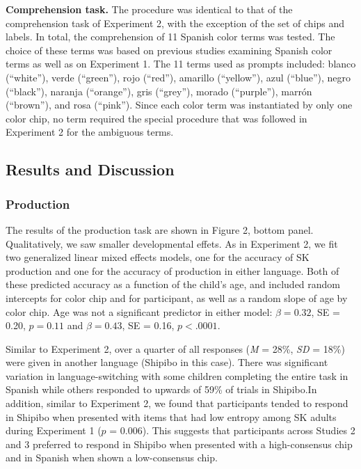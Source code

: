 \documentclass[,man,floatsintext]{apa6}
\theoremstyle{definition}
\theoremstyle{definition}
\theoremstyle{definition}
\theoremstyle{remark}
\begin{document}
\textbf{Comprehension task.} The procedure was identical to that of the
comprehension task of Experiment 2, with the exception of the set of
chips and labels. In total, the comprehension of 11 Spanish color terms
was tested. The choice of these terms was based on previous studies
examining Spanish color terms as well as on Experiment 1. The 11 terms
used as prompts included: blanco (\enquote{white}), verde
(\enquote{green}), rojo (\enquote{red}), amarillo (\enquote{yellow}),
azul (\enquote{blue}), negro (\enquote{black}), naranja
(\enquote{orange}), gris (\enquote{grey}), morado (\enquote{purple}),
marrón (\enquote{brown}), and rosa (\enquote{pink}). Since each color
term was instantiated by only one color chip, no term required the
special procedure that was followed in Experiment 2 for the ambiguous
terms.

\subsection{Results and Discussion}\label{results-and-discussion-2}

\subsubsection{Production}\label{production-1}

The results of the production task are shown in Figure 2, bottom panel.
Qualitatively, we saw smaller developmental effets. As in Experiment 2,
we fit two generalized linear mixed effects models, one for the accuracy
of SK production and one for the accuracy of production in either
language. Both of these predicted accuracy as a function of the child's
age, and included random intercepts for color chip and for participant,
as well as a random slope of age by color chip. Age was not a
significant predictor in either model: \(\beta = 0.32\), SE = 0.20,
\(p = 0.11\) and \(\beta = 0.43\), SE = 0.16, \(p < .0001\).

Similar to Experiment 2, over a quarter of all responses (\emph{M} =
28\%, \emph{SD} = 18\%) were given in another language (Shipibo in this
case). There was significant variation in language-switching with some
children completing the entire task in Spanish while others responded to
upwards of 59\% of trials in Shipibo.In addition, similar to Experiment
2, we found that participants tended to respond in Shipibo when
presented with items that had low entropy among SK adults during
Experiment 1 (\(p\) = 0.006). This suggests that participants across
Studies 2 and 3 preferred to respond in Shipibo when presented with a
high-consensus chip and in Spanish when shown a low-consensus chip.
\end{document}
